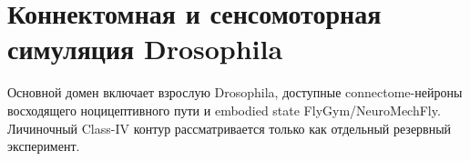 \chapter{Коннектомная и сенсомоторная симуляция Drosophila}

Основной домен включает взрослую Drosophila, доступные connectome-нейроны восходящего
ноцицептивного пути и embodied state FlyGym/NeuroMechFly.
Личиночный Class-IV контур рассматривается только как отдельный резервный эксперимент.

